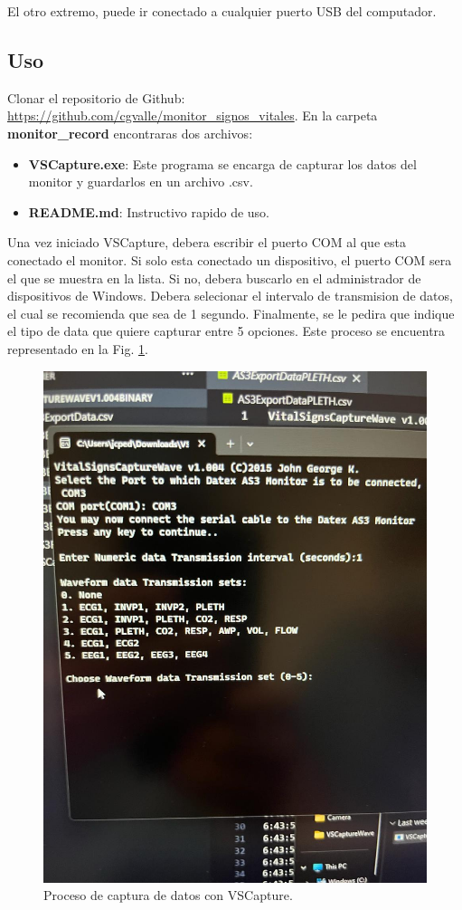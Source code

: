 \documentclass{article}
\begin{document}
El otro extremo, puede ir conectado a cualquier puerto USB del computador.



\subsection{Uso}
Clonar el repositorio de Github: \url{https://github.com/cgvalle/monitor_signos_vitales}. En la carpeta \textbf{monitor\_record} encontraras dos archivos:
\begin{itemize}
	\item \textbf{VSCapture.exe}: Este programa se encarga de capturar los datos del monitor y guardarlos en un archivo .csv.
	\item \textbf{README.md}: Instructivo rapido de uso.
\end{itemize}

Una vez iniciado VSCapture, debera escribir el puerto COM al que esta conectado el monitor. Si solo esta conectado un dispositivo, el puerto COM sera el que se muestra en la lista. Si no, debera buscarlo en el administrador de dispositivos de Windows. Debera selecionar el intervalo de transmision de datos, el cual se recomienda que sea de 1 segundo. Finalmente, se le pedira que indique el tipo de data que quiere capturar entre 5 opciones. Este proceso se encuentra representado en la Fig. \ref{fig:vs_capture}.


\begin{figure}[h]
	\centering
	\includegraphics[scale=0.2]{img/vs_capture.png}
	\caption{Proceso de captura de datos con VSCapture.}
	\label{fig:vs_capture}
\end{figure}
\end{document}
